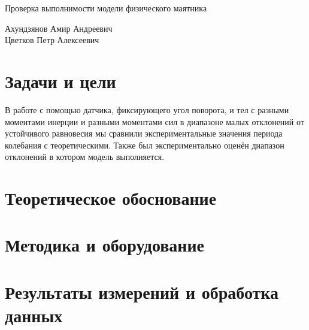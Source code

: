 \documentclass[12pt,a4paper]{scrartcl}
\begin{document}
\begin{center}
\begin{large}
Проверка выполнимости модели физического маятника
\end{large}
	\bigskip
     
Ахундзянов Амир Андреевич \\
Цветков Петр Алексеевич 
\end{center}

\section{Задачи и цели}
В работе с помощью датчика, фиксирующего угол поворота, и тел с разными моментами инерции и разными моментами сил в диапазоне малых отклонений от устойчивого равновесия мы сравнили экспериментальные значения периода колебания с теоретическими. Также был экспериментально оценён диапазон отклонений в котором модель выполняется.

\section{Теоретическое обоснование}

\section{Методика и оборудование}

\section{Результаты измерений и обработка данных}
\end{document}
